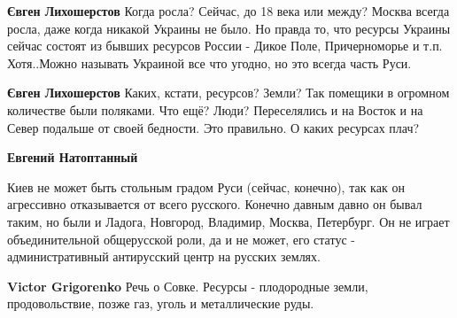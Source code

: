 \begin{itemize}
\begin{itemize}
 
\textbf{Євген Лихошерстов} Когда росла? Сейчас, до 18 века или между? Москва всегда росла, даже когда никакой Украины не было. Но правда то, что ресурсы Украины сейчас состоят из бывших ресурсов России - Дикое Поле, Причерноморье и т.п. Хотя..Можно называть Украиной все что угодно, но это всегда часть Руси.

 
\textbf{Євген Лихошерстов} Каких, кстати, ресурсов? Земли? Так помещики в огромном количестве были поляками. Что ещё? Люди? Переселялись и на Восток и на Север подальше от своей бедности. Это правильно. О каких ресурсах плач?

 
\textbf{Евгений Натоптанный} 

Киев не может быть стольным градом Руси (сейчас, конечно), так как он
агрессивно отказывается от всего русского. Конечно давным давно он бывал таким,
но были и Ладога, Новгород, Владимир, Москва, Петербург. Он не играет
объединительной общерусской роли, да и не может, его статус - административный
антирусский центр на русских землях.


 
\textbf{Victor Grigorenko} Речь о Совке. Ресурсы - плодородные земли, продовольствие, позже газ, уголь и металлические руды.

 

\end{itemize}
\end{itemize}
